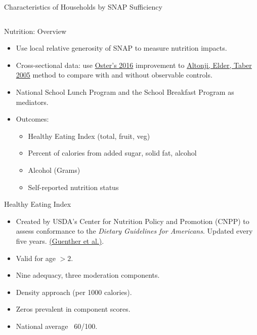 \documentclass{beamer}
\begin{document}
\begin{frame}
\begin{table}{Characteristics of Households by SNAP Sufficiency}
\begin{adjustbox}{max width=\textwidth}
\begin{tabular}{lllllll}
    
    \bottomrule
\end{tabular}
\end{adjustbox}
\end{table}
\end{frame}



\begin{frame}{Nutrition: Overview}
\begin{itemize}
\item Use local relative generosity of SNAP to measure nutrition impacts.
\item Cross-sectional data: use \href{http://www.tandfonline.com/doi/abs/10.1080/07350015.2016.1227711}{Oster's 2016} improvement to \href{http://www.journals.uchicago.edu/doi/abs/10.1086/426036}{Altonji, Elder, Taber 2005} method to compare with and without observable controls.
\item National School Lunch Program and the School Breakfast Program as mediators.
\item Outcomes:
\begin{itemize}
\item Healthy Eating Index (total, fruit, veg)
\item Percent of calories from added sugar, solid fat, alcohol %
\item Alcohol (Grams)
\item Self-reported nutrition status
\end{itemize}
\end{itemize}

\end{frame}



\begin{frame}{Healthy Eating Index}

\begin{itemize}
\item 
 Created by USDA's Center for Nutrition Policy and Promotion (CNPP) to assess conformance to the \textit{Dietary Guidelines for Americans}. Updated every five years. \href{https://www.cnpp.usda.gov/sites/default/files/healthy_eating_index/HEI2010-UpdatePaper.pdf}{(Guenther et al.)}. 
\item Valid for age $>2$.
\item 
Nine adequacy, three moderation components.
\item 
Density approach (per 1000 calories).
\item 
Zeros prevalent in component scores.
\item 
National average ~60/100. 
\end{itemize}
\end{frame}
\end{document}
